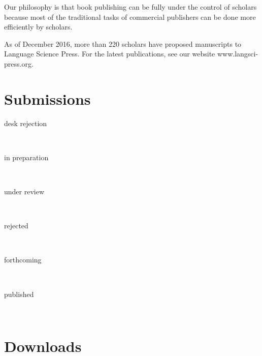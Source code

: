 \documentclass[
notumble,
nofoldmark,
]{leaflet}
\begin{document}
 Our philosophy is that book publishing can be fully under the control of scholars because most of the traditional tasks of commercial publishers can be done more efficiently by scholars. 
 
As of December 2016, more than 220 scholars have proposed manuscripts to Language Science Press. For the latest publications, see our website www.langsci-press.org. 
   
\newpage 
\newlength{\submissionfactor}
\setlength{\submissionfactor}{.5mm}
\newcommand{\submission}[3]{
\parbox[m][.1cm][c]{2.5cm}{\color{LIGHTGRAY} #1}\colorbox{#2}{\parbox[m][.3cm][c]{#3\submissionfactor}{\bfseries\sffamily #3}}\\ 
}

\section{\sffamily\Large\bfseries Submissions}
\submission{desk rejection}{lsRed}{28}
\submission{in preparation}{lsLightBlue}{118}
\submission{under review}{lsDarkBlue}{6}
\submission{rejected}{lsLightOrange}{10}
\submission{forthcoming}{lsSoftGreen}{22}
\submission{published}{lsRichGreen}{27}



 


\section{\sffamily\Large\bfseries Downloads}
\vspace*{-1em}
\parbox[b][0cm][b]{0cm}{
}
\end{document}
